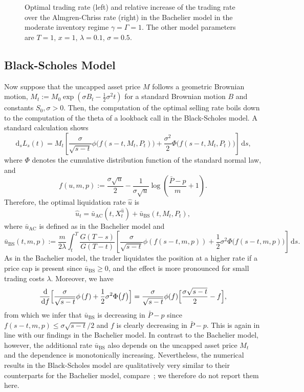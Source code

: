 \documentclass[11pt]{article}
\numberwithin{equation}{section}
\newlength\figheight
\newlength\figwidth
\theoremstyle{definition}
\theoremstyle{remark}
\newcommand{\de}{\,\mathrm{d}}
\begin{document}
\begin{figure}[ht]
 \setlength{}
 \setlength{}
 \centering
 \hspace{0.5em}
 
 \caption{Optimal trading rate (left) and relative increase of the trading rate over the Almgren-Chriss rate (right) in the Bachelier model in the moderate inventory regime $\gamma = \Gamma = 1$. The other model parameters are  $T = 1$, $x = 1$, $\lambda = 0.1$, $\sigma = 0.5$.}
 \label{fig:Bachelier:moderate}
\end{figure}


\subsection{Black-Scholes Model}
Now suppose that the uncapped asset price $M$ follows a geometric Brownian motion, $M_t:=M_0\exp\left(\sigma B_t-\frac{1}{2}\sigma^2 t\right)$ for a standard Brownian motion $B$ and constants $S_0, \sigma >0$. Then, the computation of the optimal selling rate boils down to the computation of the theta of a lookback call in the Black-Scholes model. A standard calculation shows
\[
\de_s L_s(t) = M_t\left[ \frac{\sigma}{\sqrt{s-t}}\phi\bigl(f(s-t,M_t,P_t)\bigr)+\frac{\sigma^2}{2}\Phi\bigl(f(s-t,M_t,P_t)\bigr)\right] \de s,
\]
where $\Phi$ denotes the cumulative distribution function of the standard normal law, and
\[
 f(u,m,p) := \frac{\sigma\sqrt{u}}{2} - \frac{1}{\sigma\sqrt{u}}\log\left(\frac{\bar{P}-p}{m}+1\right).
\]
Therefore, the optimal liquidation rate $\hat{u}$ is 
\[
 \hat{u}_t = \bar{u}_{\mathrm{AC}}(t,X^{\hat{u}}_t) + \bar{u}_{\mathrm{BS}}(t,M_t,P_t),
\]
where $\bar{u}_{\mathrm{AC}}$ is defined as in the Bachelier model and
\[
 \bar{u}_{\mathrm{BS}}(t,m,p) := \frac{m}{2\lambda}\int_t^T  \frac{G(T-s)}{G(T-t)} \left[ \frac{\sigma}{\sqrt{s-t}}\phi\left(f(s-t,m,p)\right)+\frac{1}{2}\sigma^2 \Phi\bigl(f(s-t,m,p)\bigr)\right] \de s.
\]
As in the Bachelier model, the trader liquidates the position at a higher rate if a price cap is present since $\bar{u}_{\mathrm{BS}}\ge 0$, and the effect is more pronounced for small trading costs $\lambda$. Moreover, we have
\[
 \frac{\de }{\de f} \Bigl[\frac{\sigma}{\sqrt{s-t}}\phi\left(f\right)+\frac{1}{2}\sigma^2 \Phi\bigl(f\bigr)\Bigr] = \frac{\sigma}{\sqrt{s-t}}\phi(f)\Bigl[\frac{\sigma\sqrt{s-t}}{2} - f\Bigr],
\]
from which we infer that $\bar{u}_{\mathrm{BS}}$ is decreasing in $\bar P - p$ since $f(s-t,m,p) \leq \sigma\sqrt{s-t}/2$ and $f$ is clearly decreasing in $\bar P - p$. This is again in line with our findings in the Bachelier model. In contrast to the Bachelier model, however, the additional rate $\bar{u}_{\mathrm{BS}}$ also depends on the uncapped asset price $M_t$ and the dependence is monotonically increasing. Nevertheless, the numerical results in the Black-Scholes model are qualitatively very similar to their counterparts for the Bachelier model, compare~\cite{forsyth.al.12}; we therefore do not report them here. 



{}

\end{document}
